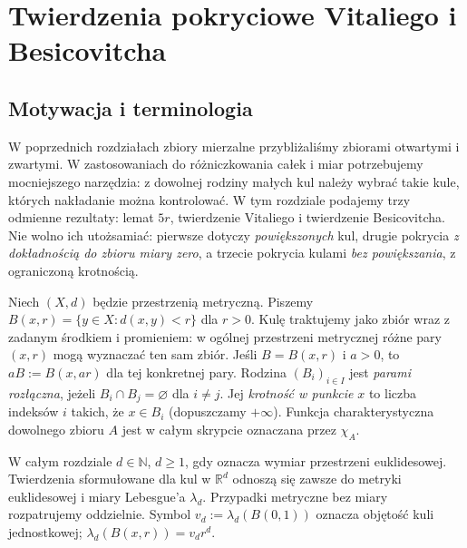 \chapter{Twierdzenia pokryciowe Vitaliego i Besicovitcha}
\label{ch:covering-24}

\providecommand{\atlasref}[2]{#2}


\section{Motywacja i terminologia}
W poprzednich rozdziałach zbiory mierzalne przybliżaliśmy
zbiorami otwartymi i zwartymi. W zastosowaniach do
różniczkowania całek i miar potrzebujemy mocniejszego narzędzia:
z dowolnej rodziny małych kul należy wybrać takie kule, których
nakładanie można kontrolować. W tym rozdziale podajemy trzy
odmienne rezultaty: lemat $5r$, twierdzenie Vitaliego i twierdzenie
Besicovitcha. Nie wolno ich utożsamiać: pierwsze dotyczy
\emph{powiększonych} kul, drugie pokrycia \emph{z dokładnością do
zbioru miary zero}, a trzecie pokrycia kulami \emph{bez powiększania},
z ograniczoną krotnością.

\begin{definicja}
\label{def:balls-24}
Niech $(X,d)$ będzie przestrzenią metryczną. Piszemy
$B(x,r)=\{y\in X:d(x,y)<r\}$ dla $r>0$.
Kulę traktujemy jako zbiór wraz z zadanym środkiem i promieniem:
w ogólnej przestrzeni metrycznej różne pary $(x,r)$ mogą
wyznaczać ten sam zbiór. Jeśli $B=B(x,r)$ i $a>0$, to
$aB:=B(x,ar)$ dla tej konkretnej pary.
Rodzina $(B_i)_{i\in I}$ jest \emph{parami rozłączna}, jeżeli
$B_i\cap B_j=\varnothing$ dla $i\ne j$.
Jej \emph{krotność w punkcie} $x$ to liczba indeksów $i$ takich,
że $x\in B_i$ (dopuszczamy $+\infty$).
Funkcja charakterystyczna dowolnego zbioru $A$ jest w całym
skrypcie oznaczana przez $\chi_A$.
\end{definicja}

\begin{uwaga}
W całym rozdziale $d\in\mathbb N$, $d\ge1$,
gdy oznacza wymiar przestrzeni euklidesowej.
Twierdzenia sformułowane dla kul w $\mathbb R^d$ odnoszą się
zawsze do metryki euklidesowej i miary Lebesgue'a $\lambda_d$.
Przypadki metryczne bez miary rozpatrujemy oddzielnie.
Symbol $v_d:=\lambda_d(B(0,1))$ oznacza objętość kuli jednostkowej;
$\lambda_d(B(x,r))=v_dr^d$.
\end{uwaga}

